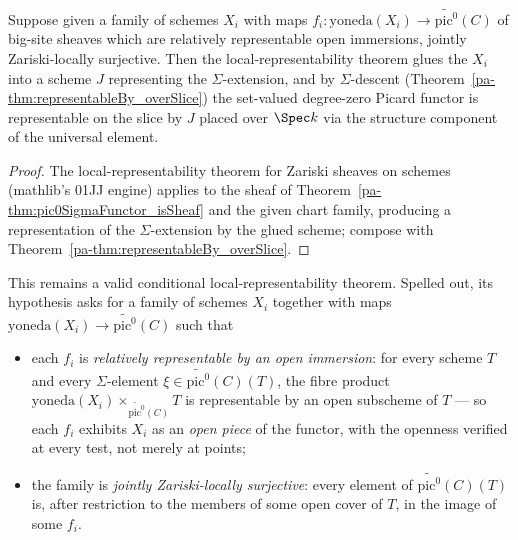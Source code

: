 \begin{definition}
  \label{pa-def:pic0RepresentableByOfCharts}
  \leanok

  Suppose given a family of schemes \(X_i\) with maps
  \(f_i \colon \mathrm{yoneda}(X_i) \to \widetilde{\mathrm{pic}^0}(C)\) of big-site sheaves
  which are relatively representable open immersions, jointly Zariski-locally surjective.
  Then the local-representability theorem glues the \(X_i\) into a scheme \(J\)
  representing the \(\Sigma\)-extension, and by \(\Sigma\)-descent
  (Theorem~\ref{pa-thm:representableBy_overSlice}) the set-valued degree-zero Picard functor is
  representable on the slice by \(J\) placed over \(\Spec k\) via the structure component of
  the universal element.
\end{definition}
\begin{proof}
  \leanok
  The local-representability theorem for Zariski sheaves on schemes (mathlib's
  01JJ engine) applies to the sheaf of Theorem~\ref{pa-thm:pic0SigmaFunctor_isSheaf} and the
  given chart family, producing a representation of the \(\Sigma\)-extension by the glued
  scheme; compose with Theorem~\ref{pa-thm:representableBy_overSlice}.
\end{proof}

This remains a valid conditional local-representability theorem. Spelled out, its hypothesis
asks for a family of schemes \(X_i\) together
with maps \(\mathrm{yoneda}(X_i) \to \widetilde{\mathrm{pic}^0}(C)\) such that

\begin{itemize}
  \item each \(f_i\) is \emph{relatively representable by an open immersion}: for every
    scheme \(T\) and every \(\Sigma\)-element \(\xi \in \widetilde{\mathrm{pic}^0}(C)(T)\),
    the fibre product \(\mathrm{yoneda}(X_i) \times_{\widetilde{\mathrm{pic}^0}(C)} T\) is
    representable by an open subscheme of \(T\) --- so each \(f_i\) exhibits \(X_i\) as an
    \emph{open piece} of the functor, with the openness verified at every test, not merely
    at points;
  \item the family is \emph{jointly Zariski-locally surjective}: every element of
    \(\widetilde{\mathrm{pic}^0}(C)(T)\) is, after restriction to the members of some open
    cover of \(T\), in the image of some \(f_i\).
\end{itemize}

